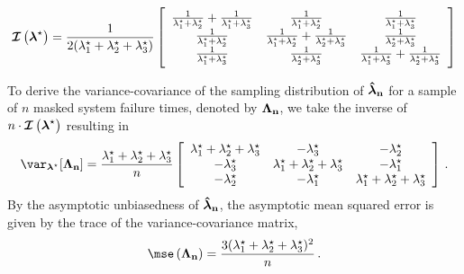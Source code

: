 \documentclass[
    11pt,
    extrafontsizes,
    article,
    oldfontcommands,
    final,
    oneside,
    openany,
    hidelinks]{memoir}
\begin{document}
\begin{equation}
\operatorname{\boldsymbol{\mathcal{I}}} \left ( {\boldsymbol{\mathbf{\lambda}}}^{\star} \right ) =
\frac{1}{2({\lambda}^{\star}_1 + {\lambda}^{\star}_2 + {\lambda}^{\star}_3)}
\left[
\begin{array}{ccc}
 \frac{1}{{\lambda}^{\star}_1+{\lambda}^{\star}_2}+\frac{1}{{\lambda}^{\star}_1+{\lambda}^{\star}_3}    & \frac{1}{{\lambda}^{\star}_1+{\lambda}^{\star}_2}                                                   & \frac{1}{{\lambda}^{\star}_1+{\lambda}^{\star}_3}\\
 \frac{1}{{\lambda}^{\star}_1+{\lambda}^{\star} _2}                                                            & \frac{1}{{\lambda}^{\star}_1+{\lambda}^{\star}_2}+\frac{1}{{\lambda}^{\star}_2+{\lambda}^{\star}_3}   & \frac{1}{{\lambda}^{\star}_2+{\lambda}^{\star}_3}\\
 \frac{1}{{\lambda}^{\star}_1+{\lambda}^{\star}_3}                                                    & \frac{1}{{\lambda}^{\star}_2+{\lambda}^{\star}_3}                                                   & \frac{1}{{\lambda}^{\star}_1+{\lambda}^{\star}_3}+\frac{1}{{\lambda}^{\star}_2+{\lambda}^{\star}_3}
\end{array}
\right]
\end{equation}

To derive the variance-covariance of the sampling distribution of $\boldsymbol{\mathbf{\hat{\boldsymbol{\mathbf{\lambda}}}_n}}$ for a sample of $n$ masked system failure times, denoted by $\mathrm{\boldsymbol{\mathbf{\Lambda_n}}}$, we take the inverse of $n \cdot \operatorname{\boldsymbol{\mathcal{I}}} \left({\boldsymbol{\mathbf{\lambda}}}^{\star} \right)$ resulting in
\begin{equation}
    \var_{\tparam{\vec\lambda}}\!\left[\sampdexpo\right] = \frac{\tparam{\lambda}_1+\tparam{\lambda}_2+\tparam{\lambda}_3}{n}
    \left[
        \begin{array}{ccc}
         \tparam{\lambda}_1 +  \tparam{\lambda}_2 +  \tparam{\lambda}_3 & - \tparam{\lambda}_3 & - \tparam{\lambda}_2 \\
        -\tparam{\lambda}_3 &  \tparam{\lambda}_1 +  \tparam{\lambda}_2   + \tparam{\lambda}_3 & - \tparam{\lambda}_1 \\
        -\tparam{\lambda}_2 & -\tparam{\lambda}_1  & \tparam{\lambda}_1   + \tparam{\lambda}_2   + \tparam{\lambda}_3 \\
\end{array}
\right]\,.
\end{equation}
By the asymptotic unbiasedness of $\boldsymbol{\mathbf{\hat{\boldsymbol{\mathbf{\lambda}}}_n}}$, the asymptotic mean squared error is given by the trace of the variance-covariance matrix,
\begin{equation}
    \mse\left(\sampdexpo\right) = \frac{3(\tparam{\lambda}_1 +  \tparam{\lambda}_2 +  \tparam{\lambda}_3)^2}{n}\,.
\end{equation}
\end{document}
